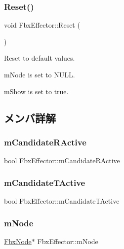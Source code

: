 \subsubsection{\texorpdfstring{Reset()}{Reset()}}
{\footnotesize\ttfamily void Fbx\+Effector\+::\+Reset (\begin{DoxyParamCaption}{ }\end{DoxyParamCaption})}

Reset to default values.
\begin{DoxyItemize}
\item m\+Node is set to N\+U\+LL.
\item m\+Show is set to true. 
\end{DoxyItemize}

\subsection{メンバ詳解}
\mbox{\label{class_fbx_effector_a12e10ffdcf48e38d2893623696ce188d}} 
\subsubsection{\texorpdfstring{m\+Candidate\+R\+Active}{mCandidateRActive}}
{\footnotesize\ttfamily bool Fbx\+Effector\+::m\+Candidate\+R\+Active}

\mbox{\label{class_fbx_effector_a624821039f6696c381004a85d2fdc237}} 
\subsubsection{\texorpdfstring{m\+Candidate\+T\+Active}{mCandidateTActive}}
{\footnotesize\ttfamily bool Fbx\+Effector\+::m\+Candidate\+T\+Active}

\mbox{\label{class_fbx_effector_ab039944d84107c7d17eef8b6915853f0}} 
\subsubsection{\texorpdfstring{m\+Node}{mNode}}
{\footnotesize\ttfamily \hyperlink{class_fbx_node}{Fbx\+Node}$\ast$ Fbx\+Effector\+::m\+Node}



